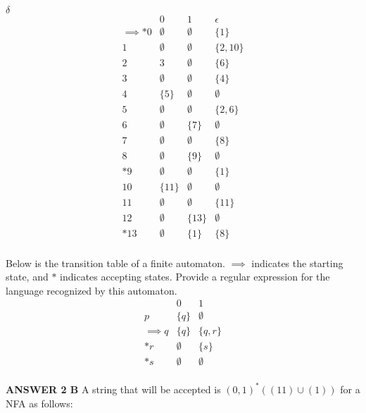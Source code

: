 \documentclass[addpoints]{exam}
\begin{document}
\begin{questions}
\begin{center}
    $\delta$
    \[
  \begin{array}{r|ccc}
    & 0 & 1 & \epsilon\\\hline
    \implies *0 &  \emptyset & \emptyset & \{1\} \\
     1 & \emptyset & \emptyset & \{2,10\}\\
    2 & 3 & \emptyset & \{6\}  \\
    3 & \emptyset & \emptyset & \{4\} \\
    4 & \{5\} & \emptyset & \emptyset  \\
    5 & \emptyset & \emptyset & \{2,6\} \\
    6 & \emptyset & \{7\} & \emptyset  \\
    7 & \emptyset & \emptyset & \{8\} \\
    8 & \emptyset & \{9\} & \emptyset  \\
    *9 & \emptyset & \emptyset & \{1\} \\
    10 & \{11\} & \emptyset & \emptyset  \\
    11 & \emptyset & \emptyset & \{11\} \\
    12 & \emptyset & \{13\} & \emptyset  \\
    *13 & \emptyset & \{1\} & \{8\} \\
    
  \end{array}
  \]
\end{center}

  
\question[5] Below is the transition table of a finite automaton. $\implies$ indicates the starting state, and $*$ indicates accepting states. Provide a regular expression for the language recognized by this automaton.
  \[
  \begin{array}{r|cc}
    & 0 & 1 \\\hline
    p & \{ q \} & \emptyset \\
    \implies q & \{ q \} & \{ q, r \} \\
    *r & \emptyset & \{ s \} \\
    *s & \emptyset & \emptyset \\
  \end{array}
  \]

  \begin{center}
      \textbf{ANSWER 2 B}
      A string that will be accepted is $(0,1)^*((11)\cup (1))$ for a NFA as follows:
  \end{center}


\end{questions}
\end{document}
